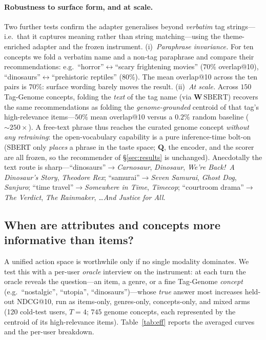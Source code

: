 \documentclass[11pt]{article}
\newcommand{\Q}{\mathbf{Q}}
\newcommand{\W}{\mathbf{W}}
\begin{document}
\paragraph{Robustness to surface form, and at scale.} Two further tests confirm the adapter generalises beyond
\emph{verbatim} tag strings---i.e.\ that it captures meaning rather than string matching---using the
theme-enriched adapter and the frozen instrument. (i)~\emph{Paraphrase invariance.} For ten concepts we fold a
verbatim name and a non-tag paraphrase and compare their recommendations: e.g.\ ``horror''$\leftrightarrow$``scary
frightening movies'' ($70\%$ overlap@10), ``dinosaurs''$\leftrightarrow$``prehistoric reptiles'' ($80\%$).
The mean overlap@10 across the ten pairs is $70\%$:
surface wording barely moves the result. (ii)~\emph{At scale.} Across $150$ Tag-Genome concepts, folding the
\emph{text} of the tag name (via $\W\,\mathrm{SBERT}$) recovers the same recommendations as folding the
\emph{genome-grounded} centroid of that tag's high-relevance items---$50\%$ mean overlap@10 versus a $0.2\%$
random baseline ($\sim\!250\times$). A free-text phrase thus reaches the curated genome concept \emph{without any
retraining}: the open-vocabulary capability is a pure inference-time bolt-on (SBERT only \emph{places} a phrase in
the taste space; $\Q$, the encoder, and the scorer are all frozen, so the recommender of \S\ref{sec:results} is
unchanged). Anecdotally the text route is sharp---``dinosaurs''$\to$\emph{Carnosaur}, \emph{Dinosaur},
\emph{We're Back!\ A Dinosaur's Story}, \emph{Theodore Rex}; ``samurai''$\to$\emph{Seven Samurai},
\emph{Ghost Dog}, \emph{Sanjuro}; ``time travel''$\to$\emph{Somewhere in Time}, \emph{Timecop}; ``courtroom
drama''$\to$\emph{The Verdict}, \emph{The Rainmaker}, \emph{\ldots And Justice for All}.

\subsection{When are attributes and concepts more informative than items?}\label{sec:efficiency}
A unified action space is worthwhile only if no single modality dominates. We test this with a per-user
\emph{oracle} interview on the instrument: at each turn the oracle reveals the question---an item, a genre, or a
fine Tag-Genome \emph{concept} (e.g.\ ``nostalgic'', ``utopia'', ``dinosaurs'')---whose \emph{true} answer most
increases held-out NDCG@10, run as items-only, genres-only, concepts-only, and mixed arms (120 cold-test users,
$T{=}4$; $745$ genome concepts, each represented by the centroid of its high-relevance items).
Table~\ref{tab:eff} reports the averaged curves and the per-user breakdown.
\end{document}
